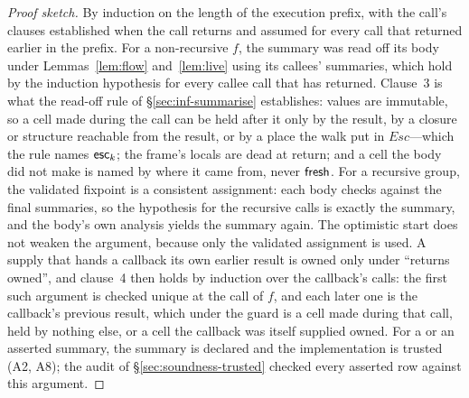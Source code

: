 \begin{proof}[Proof sketch]
By induction on the length of the execution prefix, with the call's clauses established when the call
returns and assumed for every call that returned earlier in the prefix. For a non-recursive $f$, the
summary was read off its body under Lemmas~\ref{lem:flow} and~\ref{lem:live} using its callees'
summaries, which hold by the induction hypothesis for every callee call that has returned. Clause~3 is
what the read-off rule of \S\ref{sec:inf-summarise} establishes: values are immutable, so a cell made
during the call can be held after it only by the result, by a closure or structure reachable from the
result, or by a place the walk put in $\mathit{Esc}$---which the rule names $\mathsf{esc}_k$; the frame's locals
are dead at return; and a cell the body did not make is named by where it came from, never $\mathsf{fresh}$. For
a recursive group, the validated fixpoint is a consistent assignment: each body checks against the final
summaries, so the hypothesis for the recursive calls is exactly the summary, and the body's own analysis
yields the summary again. The optimistic start does not weaken the argument, because only the validated
assignment is used. A supply that hands a callback its own earlier result is owned only under ``returns
owned'', and clause~4 then holds by induction over the callback's calls: the first such argument is checked
unique at the call of $f$, and each later one is the callback's previous result, which under the guard is
a cell made during that call, held by nothing else, or a cell the callback was itself supplied owned. For a
 or an asserted summary, the summary is declared and the implementation is trusted (A2, A8);
the audit of \S\ref{sec:soundness-trusted} checked every asserted row against this argument.


\end{proof}
